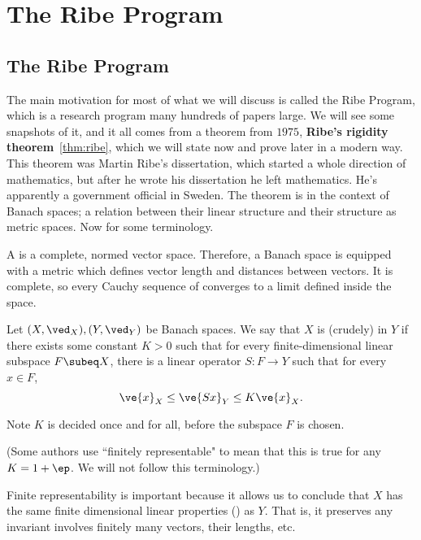 \chapter{The Ribe Program}



\section{The Ribe Program}

The main motivation for most of what we will discuss is called the Ribe Program, which is a research program many hundreds of papers large. We will see some snapshots of it, and it all comes from a theorem from $1975$, \textbf{Ribe's rigidity theorem}~\ref{thm:ribe}, which we will state now and prove later in a modern way. This theorem was Martin Ribe's dissertation, which started a whole direction of mathematics, but after he wrote his dissertation he left mathematics. He's apparently a government official in Sweden. The theorem is in the context of Banach spaces; a relation between their linear structure and their structure as metric spaces. Now for some terminology. 

\begin{df}
A  is a complete, normed vector space. Therefore, a Banach space is equipped with a metric which defines vector length and distances between vectors. It is complete, so every Cauchy sequence of converges to a limit defined inside the space. 
\end{df}


\begin{df}
Let $(X,\ved_X), (Y,\ved_Y)$ be Banach spaces. We say that $X$ is (crudely)  in $Y$ if there exists some constant $K>0$ such that for every finite-dimensional linear subspace $F\subeq X$, there is a linear operator $S: F \to Y$ such that for every $x\in F$, 
\[
\ve{x}_X\le \ve{Sx}_Y\le K\ve{x}_X.
\]
\end{df}
Note $K$ is decided once and for all, before the subspace $F$ is chosen.

(Some authors use ``finitely representable" to mean that this is true for any $K=1+\ep$. We will not follow this terminology.)

Finite representability is important because %
it allows us to conclude that $X$ has the same finite dimensional linear properties () as $Y$. That is, it preserves any invariant involves finitely many vectors, their lengths, etc.


